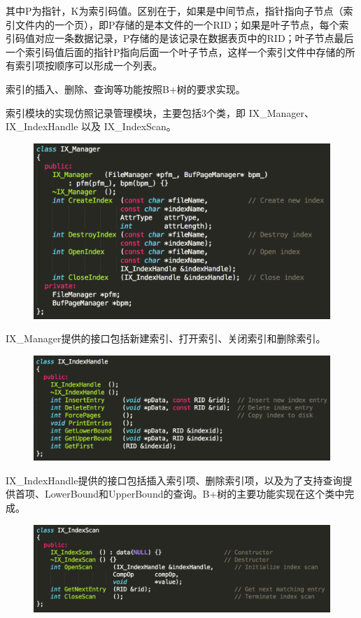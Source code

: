 其中P为指针，K为索引码值。区别在于，如果是中间节点，指针指向子节点（索引文件内的一个页），即P存储的是本文件的一个RID；如果是叶子节点，每个索引码值对应一条数据记录，P存储的是该记录在数据表页中的RID；叶子节点最后一个索引码值后面的指针P指向后面一个叶子节点，这样一个索引文件中存储的所有索引项按顺序可以形成一个列表。

索引的插入、删除、查询等功能按照B+树的要求实现。

索引模块的实现仿照记录管理模块，主要包括3个类，即 IX\_Manager、IX\_IndexHandle 以及 IX\_IndexScan。

\begin{figure}[H]
\centering
\includegraphics[width=4.5in]{Figures/IX_Manager.png}
\end{figure}

IX\_Manager提供的接口包括新建索引、打开索引、关闭索引和删除索引。

\begin{figure}[H]
\centering
\includegraphics[width=5.5in]{Figures/IX_IndexHandle.png}
\end{figure}

IX\_IndexHandle提供的接口包括插入索引项、删除索引项，以及为了支持查询提供首项、LowerBound和UpperBound的查询。B+树的主要功能实现在这个类中完成。

\begin{figure}[H]
\centering
\includegraphics[width=5.5in]{Figures/IX_IndexScan.png}
\end{figure}

